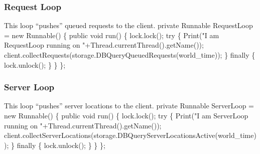 \documentclass{article}
\def\nwendcode{\endtrivlist \endgroup}
\let\nwdocspar=\par
\begin{document}
\subsubsection{Request Loop}
This loop ``pushes'' queued requests to the client.
\nwenddocs{}\endmoddef{}
private Runnable RequestLoop = new Runnable() \{
  public void run() \{
    lock.lock();
    try \{
      Print("I am RequestLoop running on "+Thread.currentThread().getName());
      client.collectRequests(storage.DBQueryQueuedRequests(world_time));
    \} finally \{
      lock.unlock();
    \}
  \}
\};
\eatline
{}\nwendcode{}\nwdocspar
\subsubsection{Server Loop}
This loop ``pushes'' server locations to the client.
\nwenddocs{}\endmoddef{}
private Runnable ServerLoop = new Runnable() \{
  public void run() \{
    lock.lock();
    try \{
      Print("I am ServerLoop running on "+Thread.currentThread().getName());
      client.collectServerLocations(storage.DBQueryServerLocationsActive(world_time));
    \} finally \{
      lock.unlock();
    \}
  \}
\};
\eatline
{}\nwendcode{}\nwdocspar
\end{document}
